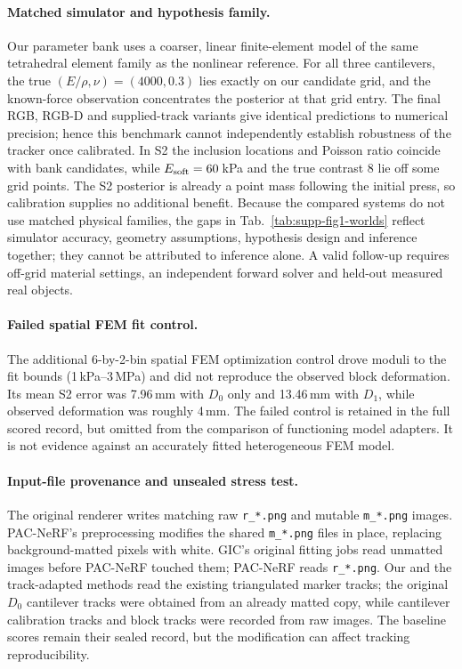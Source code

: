 \paragraph{Matched simulator and hypothesis family.}
Our parameter bank uses a coarser, linear finite-element model of the same tetrahedral element family as the nonlinear reference. For all three cantilevers, the true $(E/\rho,\nu)=(4000,0.3)$ lies exactly on our candidate grid, and the known-force observation concentrates the posterior at that grid entry. The final RGB, RGB-D and supplied-track variants give identical predictions to numerical precision; hence this benchmark cannot independently establish robustness of the tracker once calibrated. In S2 the inclusion locations and Poisson ratio coincide with bank candidates, while $E_{\rm soft}=60$\,kPa and the true contrast 8 lie off some grid points. The S2 posterior is already a point mass following the initial press, so calibration supplies no additional benefit. Because the compared systems do not use matched physical families, the gaps in Tab.~\ref{tab:supp-fig1-worlds} reflect simulator accuracy, geometry assumptions, hypothesis design and inference together; they cannot be attributed to inference alone. A valid follow-up requires off-grid material settings, an independent forward solver and held-out measured real objects.

\paragraph{Failed spatial FEM fit control.}
The additional 6-by-2-bin spatial FEM optimization control drove moduli to the fit bounds (1\,kPa--3\,MPa) and did not reproduce the observed block deformation. Its mean S2 error was 7.96\,mm with $D_0$ only and 13.46\,mm with $D_1$, while observed deformation was roughly 4\,mm. The failed control is retained in the full scored record, but omitted from the comparison of functioning model adapters. It is not evidence against an accurately fitted heterogeneous FEM model.

\paragraph{Input-file provenance and unsealed stress test.}
The original renderer writes matching raw \texttt{r\_*.png} and mutable \texttt{m\_*.png} images. PAC-NeRF's preprocessing modifies the shared \texttt{m\_*.png} files in place, replacing background-matted pixels with white. GIC's original fitting jobs read unmatted images before PAC-NeRF touched them; PAC-NeRF reads \texttt{r\_*.png}. Our and the track-adapted methods read the existing triangulated marker tracks; the original $D_0$ cantilever tracks were obtained from an already matted copy, while cantilever calibration tracks and block tracks were recorded from raw images. The baseline scores remain their sealed record, but the modification can affect tracking reproducibility.

